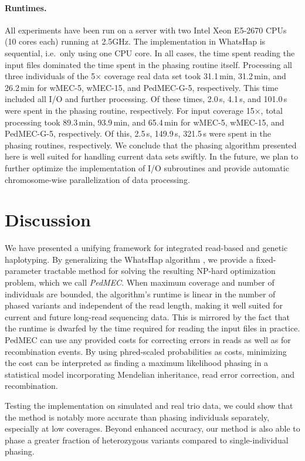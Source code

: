 \paragraph{Runtimes.}
All experiments have been run on a server with two Intel Xeon E5-2670 CPUs (10 cores each) running at 2.5GHz.
The implementation in WhatsHap is sequential, i.e.\ only using one CPU core.
In all cases, the time spent reading the input files dominated the time spent in the phasing routine itself.
Processing all three individuals of the 5$\times$ coverage real data set took 31.1\,min, 31.2\,min, and 26.2\,min for wMEC-5, wMEC-15, and \mbox{PedMEC-G-5}, respectively.
This time included all I/O and further processing.
Of these times, 2.0\,s, 4.1\,s, and 101.0\,s were spent in the phasing routine, respectively.
For input coverage 15$\times$, total processing took 89.3\,min, 93.9\,min, and 65.4\,min for wMEC-5, wMEC-15, and \mbox{PedMEC-G-5}, respectively.
Of this, 2.5\,s, 149.9\,s, 321.5\,s were spent in the phasing routines, respectively.
We conclude that the phasing algorithm presented here is well suited for handling current data sets swiftly.
In the future, we plan to further optimize the implementation of I/O subroutines and provide automatic chromosome-wise parallelization of data processing.

\section{Discussion}
We have presented a unifying framework for integrated read-based and genetic haplotyping.
By generalizing the WhatsHap algorithm \citep{Patterson2015}, we provide a fixed-parameter tractable method for solving the resulting NP-hard optimization problem, which we call \emph{PedMEC}.
When maximum coverage and number of individuals are bounded, the algorithm's runtime is linear in the number of phased variants and independent of the read length, making it well suited for current and future long-read sequencing data.
This is mirrored by the fact that the runtime is dwarfed by the time required for reading the input files in practice.
PedMEC can use any provided costs for correcting errors in reads as well as for recombination events.
By using phred-scaled probabilities as costs, minimizing the cost can be interpreted as finding a maximum likelihood phasing in a statistical model incorporating Mendelian inheritance, read error correction, and recombination.

Testing the implementation on simulated and real trio data, we could show that the method is notably more accurate than phasing individuals separately, especially at low coverages.
Beyond enhanced accuracy, our method is also able to phase a greater fraction of heterozygous variants compared to single-individual phasing.

